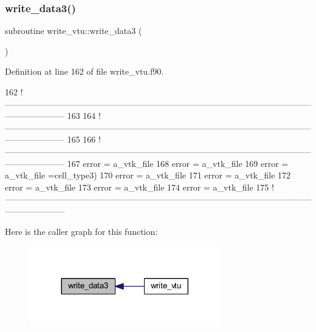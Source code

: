 \subsubsection{\texorpdfstring{write\+\_\+data3()}{write\_data3()}}
{\footnotesize\ttfamily subroutine write\+\_\+vtu\+::write\+\_\+data3 (\begin{DoxyParamCaption}{ }\end{DoxyParamCaption})}



Definition at line 162 of file write\+\_\+vtu.\+f90.


\begin{DoxyCode}
162   \textcolor{comment}{
      !---------------------------------------------------------------------------------------------------------------------------------}
163   
164   \textcolor{comment}{
      !---------------------------------------------------------------------------------------------------------------------------------}
165 
166   \textcolor{comment}{
      !---------------------------------------------------------------------------------------------------------------------------------}
167   error = a\_vtk\_file%
168   error = a\_vtk\_file%
169   error = a\_vtk\_file%
      =cell\_type3)
170   error = a\_vtk\_file%
171   error = a\_vtk\_file%
172   error = a\_vtk\_file%
173   error = a\_vtk\_file%
174   error = a\_vtk\_file%
175   \textcolor{comment}{
      !---------------------------------------------------------------------------------------------------------------------------------}
\end{DoxyCode}
Here is the caller graph for this function\+:
\nopagebreak
\begin{figure}[H]
\begin{center}
\leavevmode
\includegraphics[width=236pt]{write__vtu_8f90_ab859d2be74950aa978bc251eddf0b307_icgraph}
\end{center}
\end{figure}
\mbox{\label{write__vtu_8f90_a2a0b4e97269ec439c6dd440509f9742c}} 
